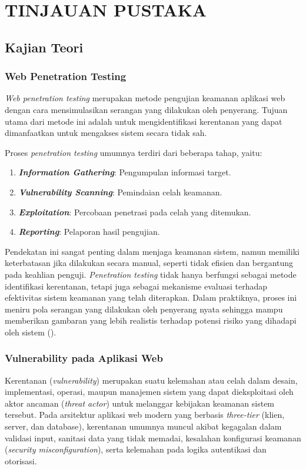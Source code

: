 \chapter{TINJAUAN PUSTAKA}

\section{Kajian Teori}

\subsection{Web Penetration Testing}
\textit{Web penetration testing} merupakan metode pengujian keamanan aplikasi web dengan cara mensimulasikan serangan yang dilakukan oleh penyerang. Tujuan utama dari metode ini adalah untuk mengidentifikasi kerentanan yang dapat dimanfaatkan untuk mengakses sistem secara tidak sah.

Proses \textit{penetration testing} umumnya terdiri dari beberapa tahap, yaitu:
\begin{enumerate}
    \item \textbf{\textit{Information Gathering}}: Pengumpulan informasi target.
    \item \textbf{\textit{Vulnerability Scanning}}: Pemindaian celah keamanan.
    \item \textbf{\textit{Exploitation}}: Percobaan penetrasi pada celah yang ditemukan.
    \item \textbf{\textit{Reporting}}: Pelaporan hasil pengujian.
\end{enumerate}

Pendekatan ini sangat penting dalam menjaga keamanan sistem, namun memiliki keterbatasan jika dilakukan secara manual, seperti tidak efisien dan bergantung pada keahlian penguji. \textit{Penetration testing} tidak hanya berfungsi sebagai metode identifikasi kerentanan, tetapi juga sebagai mekanisme evaluasi terhadap efektivitas sistem keamanan yang telah diterapkan. Dalam praktiknya, proses ini meniru pola serangan yang dilakukan oleh penyerang nyata sehingga mampu memberikan gambaran yang lebih realistis terhadap potensi risiko yang dihadapi oleh sistem (\cite{singerfriedman2014}).

\subsection{Vulnerability pada Aplikasi Web}

Kerentanan (\textit{vulnerability}) merupakan suatu kelemahan atau celah dalam desain, implementasi, operasi, maupun manajemen sistem yang dapat dieksploitasi oleh aktor ancaman (\textit{threat actor}) untuk melanggar kebijakan keamanan sistem tersebut. Pada arsitektur aplikasi web modern yang berbasis \textit{three-tier} (klien, server, dan database), kerentanan umumnya muncul akibat kegagalan dalam validasi input, sanitasi data yang tidak memadai, kesalahan konfigurasi keamanan (\textit{security misconfiguration}), serta kelemahan pada logika autentikasi dan otorisasi.


